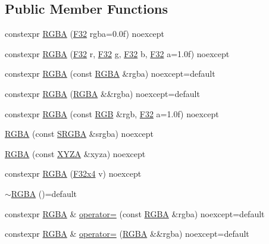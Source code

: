\subsection*{Public Member Functions}
\begin{DoxyCompactItemize}
\item 
constexpr \hyperlink{structmage_1_1_r_g_b_a_afe334e4408a71e808b8cf0bc9dd06dde}{R\+G\+BA} (\hyperlink{namespacemage_aa97e833b45f06d60a0a9c4fc22ae02c0}{F32} rgba=0.\+0f) noexcept
\item 
constexpr \hyperlink{structmage_1_1_r_g_b_a_a12ae339b8bcae0a1c0aacad280963ade}{R\+G\+BA} (\hyperlink{namespacemage_aa97e833b45f06d60a0a9c4fc22ae02c0}{F32} r, \hyperlink{namespacemage_aa97e833b45f06d60a0a9c4fc22ae02c0}{F32} g, \hyperlink{namespacemage_aa97e833b45f06d60a0a9c4fc22ae02c0}{F32} b, \hyperlink{namespacemage_aa97e833b45f06d60a0a9c4fc22ae02c0}{F32} a=1.\+0f) noexcept
\item 
constexpr \hyperlink{structmage_1_1_r_g_b_a_ad399faf871c1dec0ee3c4c0eb89329df}{R\+G\+BA} (const \hyperlink{structmage_1_1_r_g_b_a}{R\+G\+BA} \&rgba) noexcept=default
\item 
constexpr \hyperlink{structmage_1_1_r_g_b_a_a931063ef190241d875856430aa9fbac9}{R\+G\+BA} (\hyperlink{structmage_1_1_r_g_b_a}{R\+G\+BA} \&\&rgba) noexcept=default
\item 
constexpr \hyperlink{structmage_1_1_r_g_b_a_ad766984007f021cdde26f63436d90825}{R\+G\+BA} (const \hyperlink{structmage_1_1_r_g_b}{R\+GB} \&rgb, \hyperlink{namespacemage_aa97e833b45f06d60a0a9c4fc22ae02c0}{F32} a=1.\+0f) noexcept
\item 
\hyperlink{structmage_1_1_r_g_b_a_a82b256781126a25fd7a9a84a75fffb90}{R\+G\+BA} (const \hyperlink{structmage_1_1_s_r_g_b_a}{S\+R\+G\+BA} \&srgba) noexcept
\item 
\hyperlink{structmage_1_1_r_g_b_a_a008be57a6540fee8ed02d285681e3ed4}{R\+G\+BA} (const \hyperlink{structmage_1_1_x_y_z_a}{X\+Y\+ZA} \&xyza) noexcept
\item 
constexpr \hyperlink{structmage_1_1_r_g_b_a_a058e985bdbdf376616d1f6dd121d2dd8}{R\+G\+BA} (\hyperlink{namespacemage_a9b8168505574a087f7391e56522fa584}{F32x4} v) noexcept
\item 
\hyperlink{structmage_1_1_r_g_b_a_a139a22381a3fb02d1f28be505b41c9df}{$\sim$\+R\+G\+BA} ()=default
\item 
constexpr \hyperlink{structmage_1_1_r_g_b_a}{R\+G\+BA} \& \hyperlink{structmage_1_1_r_g_b_a_af8b32f51870ad86f65e5307337b42420}{operator=} (const \hyperlink{structmage_1_1_r_g_b_a}{R\+G\+BA} \&rgba) noexcept=default
\item 
constexpr \hyperlink{structmage_1_1_r_g_b_a}{R\+G\+BA} \& \hyperlink{structmage_1_1_r_g_b_a_a66f6476166086849d031b99b458e6f7c}{operator=} (\hyperlink{structmage_1_1_r_g_b_a}{R\+G\+BA} \&\&rgba) noexcept=default
\end{DoxyCompactItemize}


